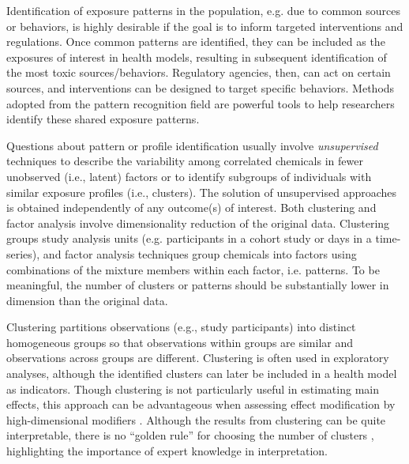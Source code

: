 Identification of exposure patterns in the population, e.g. due to common sources or behaviors, is highly desirable if the goal is to inform targeted interventions and regulations. Once common patterns are identified, they can be included as the exposures of interest in health models, resulting in subsequent identification of the most toxic sources/behaviors. Regulatory agencies, then, can act on certain sources, and interventions can be designed to target specific behaviors. Methods adopted from the pattern recognition field are powerful tools to help researchers identify these shared exposure patterns. 

Questions about pattern or profile identification usually involve \textit{unsupervised} techniques to describe the variability among correlated chemicals in fewer unobserved (i.e., latent) factors or to identify subgroups of individuals with similar exposure profiles (i.e., clusters). The solution of unsupervised approaches is obtained independently of any outcome(s) of interest. Both clustering and factor analysis involve dimensionality reduction of the original data. Clustering groups study analysis units (e.g. participants in a cohort study or days in a time-series), and factor analysis techniques group chemicals into factors using combinations of the mixture members within each factor, i.e. patterns. To be meaningful, the number of clusters or patterns should be substantially lower in dimension than the original data. 

Clustering partitions observations (e.g., study participants) into distinct homogeneous groups so that observations within groups are similar and observations across groups are different. Clustering is often used in exploratory analyses, although the identified clusters can later be included in a health model as indicators. Though clustering is not particularly useful in estimating main effects, this approach can be advantageous when assessing effect modification by high-dimensional modifiers \citep{mak15_clusters}. Although the results from clustering can be quite interpretable, there is no ``golden rule'' for choosing the number of clusters \citep{ISLR}, highlighting the importance of expert knowledge in interpretation.

